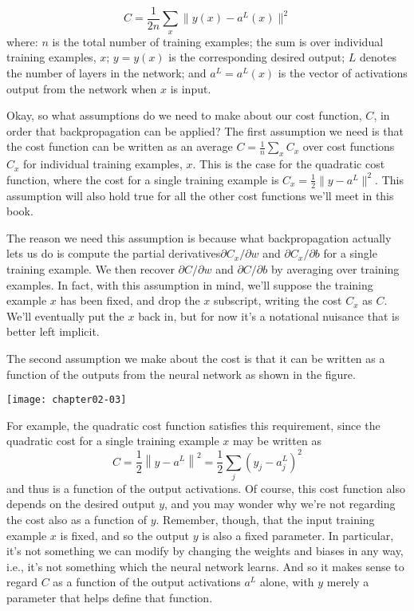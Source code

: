 \begin{equation}
C=\frac{1}{2 n} \sum_{x}\parallel y(x)-a^{L}(x)\parallel ^{2}
\label{eq:c02-26}
\end{equation}
where: $n$ is the total number of training examples; the sum is over individual training examples, $x$; $y=y(x)$ is the corresponding desired output; $L$ denotes the number of layers in the network; and $a^L=a^L(x)$ is the vector of activations output from the network when $x$ is input.

Okay, so what assumptions do we need to make about our cost function, $C$, in order that backpropagation can be applied? The first assumption we need is that the cost function can be written as an average $C=\frac{1}{n} \sum_{x} C_{x}$ over cost functions $C_x$ for individual training examples, $x$. This is the case for the quadratic cost function, where the cost for a single training example is  
$C_{x}=\frac{1}{2}\parallel y-a^{L}\parallel^{2}$.  This assumption will also hold true for all the other cost functions we'll meet in this book.

The reason we need this assumption is because what backpropagation actually lets us do is compute the partial derivatives$\partial C_{x} / \partial w$ and $\partial C_{x} / \partial b$ for a single training example. We then recover $\partial C / \partial w$ and $\partial C / \partial b$ by averaging over training examples. In fact, with this assumption in mind, we'll suppose the training example $x$ has been fixed, and drop the $x$ subscript, writing the cost $C_x$ as $C$. We'll eventually put the $x$ back in, but for now it's a notational nuisance that is better left implicit.

The second assumption we make about the cost is that it can be written as a function of the outputs from the neural network as shown in the figure.
\begin{marginfigure}
\texttt{[image: chapter02-03]}
\end{marginfigure}


For example, the quadratic cost function satisfies this requirement, since the quadratic cost for a single training example $x$ may be written as 
\begin{equation}
C=\frac{1}{2}\left\|y-a^{L}\right\|^{2}=\frac{1}{2} \sum_{j}\left(y_{j}-a_{j}^{L}\right)^{2}
\label{eq:c02-27}
\end{equation}
and thus is a function of the output activations. Of course, this cost function also depends on the desired output $y$, and you may wonder why we're not regarding the cost also as a function of $y$. Remember, though, that the input training example $x$ is fixed, and so the output $y$ is also a fixed parameter. In particular, it's not something we can modify by changing the weights and biases in any way, i.e., it's not something which the neural network learns. And so it makes sense to regard $C$ as a function of the output activations $a^L$ alone, with $y$ merely a parameter that helps define that function.



